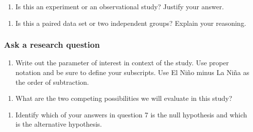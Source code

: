 \documentclass[
]{report}
\providecommand{\tightlist}{%
  \setlength{\itemsep}{0pt}\setlength{\parskip}{0pt}}
\newcommand\latexcode[1]{#1}
\begin{document}
\vspace{.6in}

\newpage

\begin{enumerate}
\def\labelenumi{\arabic{enumi}.}
\setcounter{enumi}{3}
\tightlist
\item
  Is this an experiment or an observational study? Justify your answer.
\end{enumerate}

\vspace{1in}

\begin{enumerate}
\def\labelenumi{\arabic{enumi}.}
\setcounter{enumi}{4}
\tightlist
\item
  Is this a paired data set or two independent groups? Explain your reasoning.
\end{enumerate}

\vspace{1in}

\hypertarget{ask-a-research-question-4}{%
\subsubsection*{Ask a research question}\label{ask-a-research-question-4}}

\begin{enumerate}
\def\labelenumi{\arabic{enumi}.}
\setcounter{enumi}{5}
\tightlist
\item
  Write out the parameter of interest in context of the study. Use proper notation and be sure to define your subscripts. Use El Ni\latexcode{\~{n}}o minus La Ni\latexcode{\~{n}}a as the order of subtraction.
\end{enumerate}

\vspace{1in}

\begin{enumerate}
\def\labelenumi{\arabic{enumi}.}
\setcounter{enumi}{6}
\tightlist
\item
  What are the two competing possibilities we will evaluate in this study?
\end{enumerate}

\vspace{1in}

\begin{enumerate}
\def\labelenumi{\arabic{enumi}.}
\setcounter{enumi}{7}
\tightlist
\item
  Identify which of your answers in question 7 is the null hypothesis and which is the alternative hypothesis.
\end{enumerate}
\end{document}
